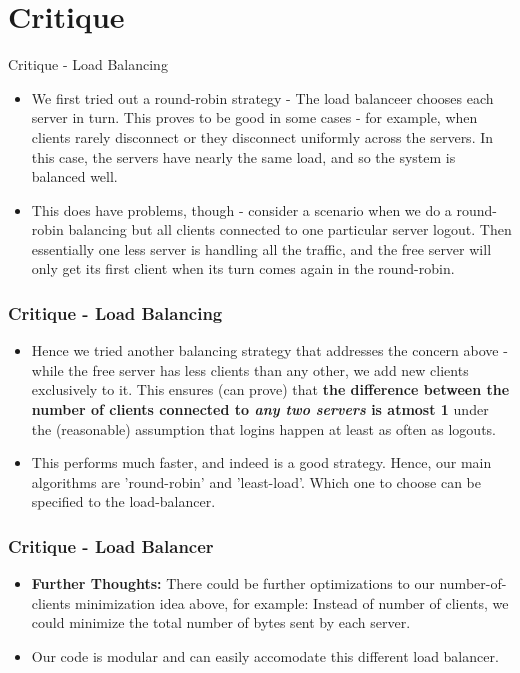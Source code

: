 \documentclass{beamer}
\renewcommand{\b}[1]{\textbf{#1}}
\begin{document}
\section{Critique}
\begin{frame}{Critique - Load Balancing}
    \begin{itemize}
        \item We first tried out a round-robin strategy - The load balanceer chooses each server in turn. This proves to be good in some cases - for example, when clients rarely disconnect or they disconnect uniformly across the servers. In this case, the servers have nearly the same load, and so the system is balanced well.
        \item This does have problems, though - consider a scenario when we do a round-robin balancing but all clients connected to one particular server logout. Then essentially one less server is handling all the traffic, and the free server will only get its first client when its turn comes again in the round-robin.
    \end{itemize}
\end{frame}

\begin{frame}
    \frametitle{Critique - Load Balancing}
    \begin{itemize}
        \item Hence we tried another balancing strategy that addresses the concern above - while the free server has less clients than any other, we add new clients exclusively to it. This ensures (can prove) that \b{the difference between the number of clients connected to \emph{any two servers} is atmost 1} under the (reasonable) assumption that logins happen at least as often as logouts.
        \item This performs much faster, and indeed is a good strategy. Hence, our main algorithms are 'round-robin' and 'least-load'. Which one to choose can be specified to the load-balancer.
    \end{itemize}
\end{frame}

\begin{frame}
    \frametitle{Critique - Load Balancer}
    \begin{itemize}
        \item \b{Further Thoughts: }There could be further optimizations to our number-of-clients minimization idea above, for example: Instead of number of clients, we could minimize the total number of bytes sent by each server.
        \item Our code is modular and can easily accomodate this different load balancer.
    \end{itemize}
\end{frame}

\begin{frame}
    \frametitle{}

    

\end{frame}
\end{document}
